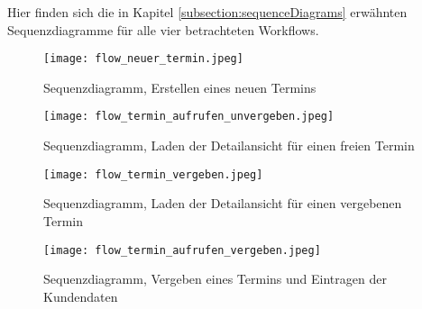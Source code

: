 Hier finden sich die in Kapitel \ref{subsection:sequenceDiagrams} erwähnten Sequenzdiagramme für alle vier betrachteten Workflows.

\begin{figure}[H]
    \caption{Sequenzdiagramm, Erstellen eines neuen Termins}
    \centering
    \texttt{[image: flow\_neuer\_termin.jpeg]}
\end{figure}

\begin{figure}[H]
    \caption{Sequenzdiagramm, Laden der Detailansicht für einen freien Termin}
    \centering
    \texttt{[image: flow\_termin\_aufrufen\_unvergeben.jpeg]}
\end{figure}

\begin{figure}[H]
    \caption{Sequenzdiagramm, Laden der Detailansicht für einen vergebenen Termin}
    \centering
    \texttt{[image: flow\_termin\_vergeben.jpeg]}
\end{figure}

\begin{figure}[H]
    \caption{Sequenzdiagramm, Vergeben eines Termins und Eintragen der Kundendaten}
    \centering
    \texttt{[image: flow\_termin\_aufrufen\_vergeben.jpeg]}
\end{figure}

